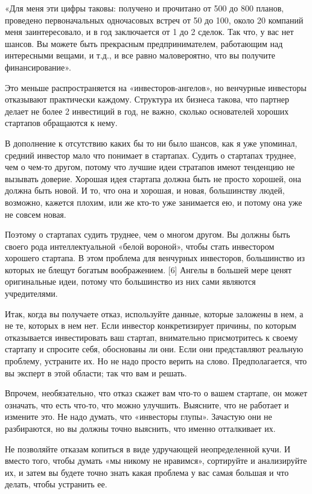 \documentclass[ebook,12pt,oneside,openany]{memoir}
\begin{document}
«Для меня эти цифры таковы: получено и прочитано от 500 до 800 планов,
проведено первоначальных одночасовых встреч от 50 до 100, около 20
компаний меня заинтересовало, и в год заключается от 1 до 2 сделок.
Так что, у вас нет шансов. Вы можете быть прекрасным предпринимателем,
работающим над интересными вещами, и т.д., и все равно маловероятно,
что вы получите финансирование».

Это меньше распространяется на «инвесторов-ангелов», но венчурные
инвесторы отказывают практически каждому. Структура их бизнеса такова,
что партнер делает не более 2 инвестиций в год, не важно, сколько
основателей хороших стартапов обращаются к нему.

В дополнение к отсутствию каких бы то ни было шансов, как я уже
упоминал, средний инвестор мало что понимает в стартапах. Судить о
стартапах труднее, чем о чем-то другом, потому что лучшие идеи
стратапов имеют тенденцию не вызывать доверие. Хорошая идея стартапа
должна быть не просто хорошей, она должна быть новой. И то, что она и
хорошая, и новая, большинству людей, возможно, кажется плохим, или же
кто-то уже занимается ею, и потому она уже не совсем новая.

Поэтому о стартапах судить труднее, чем о многом другом. Вы должны
быть своего рода интеллектуальной «белой вороной», чтобы стать
инвестором хорошего стартапа. В этом проблема для венчурных
инвесторов, большинство из которых не блещут богатым воображением. [6]
Ангелы в большей мере ценят оригинальные идеи, потому что большинство
из них сами являются учредителями.

Итак, когда вы получаете отказ, используйте данные, которые заложены в
нем, а не те, которых в нем нет. Если инвестор конкретизирует причины,
по которым отказывается инвестировать ваш стартап, внимательно
присмотритесь к своему стартапу и спросите себя, обоснованы ли они.
Если они представляют реальную проблему, устраните их. Но не надо
просто верить на слово. Предполагается, что вы эксперт в этой области;
так что вам и решать.

Впрочем, необязательно, что отказ скажет вам что-то о вашем стартапе,
он может означать, что есть что-то, что можно улучшить. Выясните, что
не работает и измените это. Не надо думать, что «инвесторы глупы».
Зачастую они не разбираются, но вы должны точно выяснить, что именно
отталкивает их.

Не позволяйте отказам копиться в виде удручающей неопределенной кучи.
И вместо того, чтобы думать «мы никому не нравимся», сортируйте и
анализируйте их, и затем вы будете точно знать какая проблема у вас
самая большая и что делать, чтобы устранить ее.
\end{document}
